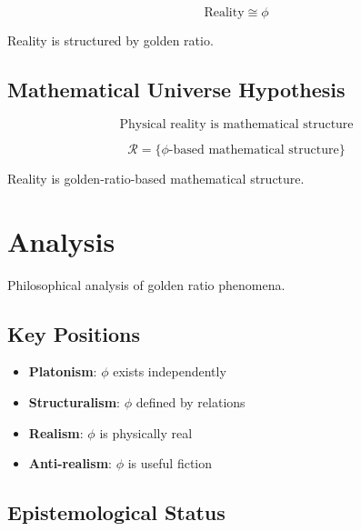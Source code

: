 \begin{theorem}
\label{thm:pythagorean-golden}
\begin{equation}
\text{Reality} \cong \phi
\end{equation}

Reality is structured by golden ratio.
\end{theorem}

\subsection{Mathematical Universe Hypothesis}

\begin{definition}[MUH]
\label{def:muh}
\begin{equation}
\text{Physical reality is mathematical structure}
\end{equation}
\end{definition}

\begin{proposition}
\label{prop:golden-muh}
\begin{equation}
\mathcal{R} = \{\phi\text{-based mathematical structure}\}
\end{equation}

Reality is golden-ratio-based mathematical structure.
\end{proposition}

\section{Analysis}

Philosophical analysis of golden ratio phenomena.

\subsection{Key Positions}

\begin{itemize}
    \item \textbf{Platonism}: $\phi$ exists independently
    \item \textbf{Structuralism}: $\phi$ defined by relations
    \item \textbf{Realism}: $\phi$ is physically real
    \item \textbf{Anti-realism}: $\phi$ is useful fiction
\end{itemize}

\subsection{Epistemological Status}

